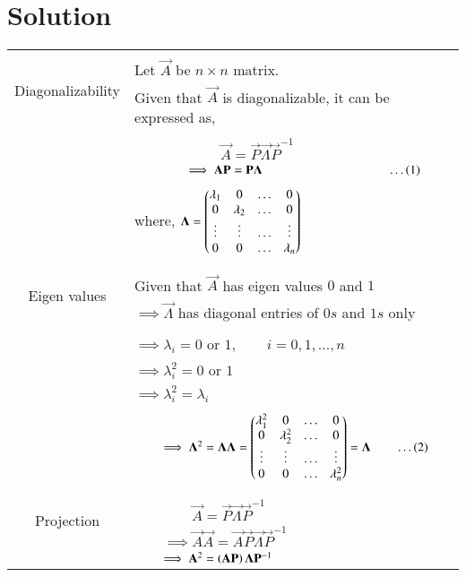 \documentclass[journal,12pt]{IEEEtran}
\begin{document}
\section{\textbf{Solution}}
\renewcommand{\thetable}{2}
\begin{longtable}{|c|l|}
    \hline
	\multirow{3}{*}{Diagonalizability} 
	& \\
	& Let $\vec{A}$ be $n\times n$ matrix.\\
	& Given that $\vec{A}$ is diagonalizable, it can be expressed as,\\
	&\\
	& $\qquad \qquad\qquad \vec{A}=\vec{P}\vec{\Lambda}\vec{P}^{-1}$\\
	& $\qquad\qquad\implies \mathbf{A}\mathbf{P}=\mathbf{P}\mathbf{\Lambda}\qquad\qquad\qquad\qquad\qquad\dots\left(1\right)$\\
	&\\
	& where, $\mathbf{\Lambda}=\begin{pmatrix}\lambda_1&0&\dots&0\\0&\lambda_2&\dots&0\\ \vdots&\vdots&\dots&\vdots\\0&0&\dots&\lambda_n\end{pmatrix}$\\
	&\\
	\hline
	\multirow{3}{*}{Eigen values} & \\
	& Given that $\vec{A}$ has eigen values $0$ and $1$\\
	&$\implies \vec{\Lambda}$ has diagonal entries of $0s$ and $1s$ only\\ 
	&\\
	&$\implies \lambda_i=0$ or $1,\qquad i=0,1,\dots,n$\\
	&$\implies \lambda_i^2=0$ or $1$\\
	&$\implies \lambda_i^2=\lambda_i$\\
	&\\
	& $\qquad\implies \Vec{\Lambda}^2=\Vec{\Lambda}\Vec{\Lambda}=\myvec{\lambda_1^2&0&\dots&0\\0&\lambda_2^2&\dots&0\\ \vdots&\vdots&\dots&\vdots\\0&0&\dots&\lambda_n^2}=\vec{\Lambda}\qquad\dots\brak{2}$\\
	&\\
	\hline
	\multirow{3}{*}{Projection}&\\ 
	&$\qquad\qquad\vec{A}=\vec{P}\vec{\Lambda}\vec{P}^{-1}$\\
	&$\qquad\implies \vec{A}\vec{A}=\vec{A}\vec{P}\vec{\Lambda}\vec{P}^{-1}$\\
	&$\qquad\implies \mathbf{A}^2=\left(\mathbf{A}\mathbf{P}\right)\mathbf{\Lambda}\mathbf{P}^{-1}$\\

\end{longtable}
\end{document}
